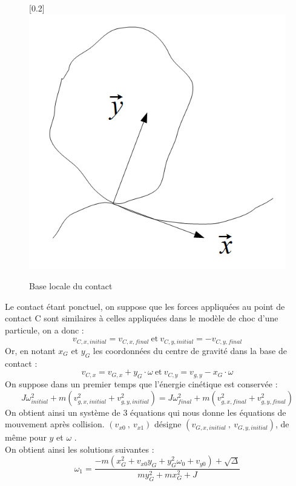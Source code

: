 \begin{center}
\begin{figure}[h]
\begin{center}
\scalebox{0.2}[0.2]{\includegraphics*{../images/collision.png}}
\end{center}
\caption{Base locale du contact}
\end{figure}
\end{center}
Le contact étant ponctuel, on suppose que les forces appliquées au point
de contact C sont similaires à celles appliquées dans le modèle de choc d'une particule, on a donc :
\begin{equation}
v_{C,x,initial} = v_{C,x,final} \: \text{et} \: v_{C,y,initial} = -v_{C,y,final}
\end{equation}
Or, en notant $x_G$ et $y_G$ les coordonnées du centre de gravité dans 
la base de contact :
\begin{equation}
v_{C,x}=v_{G,x}+y_G \cdot \omega \: \text{et} \: v_{C,y} = v_{g,y} -x_G\cdot \omega
\end{equation}
On suppose dans un premier temps que l'énergie cinétique est conservée :
\begin{equation}
J\omega^2_{initial} + m(v^2_{g,x,initial} + v^2_{g,y,initial} )
=
J\omega^2_{final} + m(v^2_{g,x,final} + v^2_{g,y,final} )
\end{equation}
On obtient ainsi un système de 3 équations qui nous donne les équations de
mouvement après collision.
$(v_{x0} \: , \: v_{x1})$ désigne $(v_{G,x,initial} \: , \: v_{G,y,initial})$,
de même pour $y$ et $\omega$ .\\
On obtient ainsi les solutions suivantes :
\begin{equation}
\omega_1 = \frac{-m(x^2_G+v_{x0}y_G+y^2_G\omega_0 + v_{y0}) +\sqrt{\Delta}}{my^2_G + mx^2_G +J}
\end{equation}

